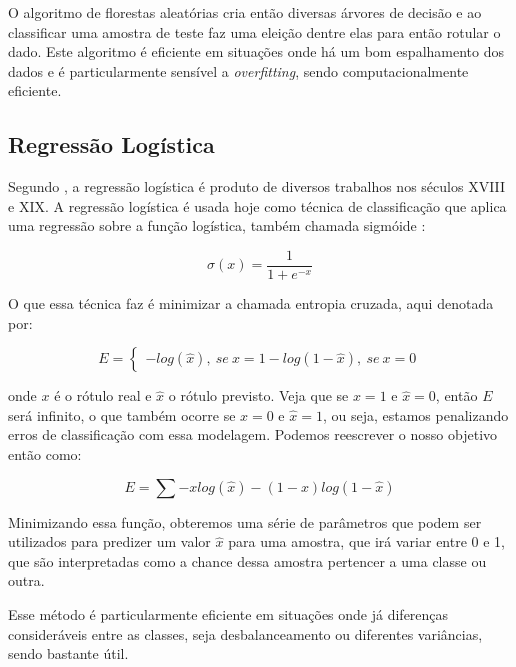 O algoritmo de florestas aleatórias cria então diversas árvores de decisão e ao classificar uma amostra de teste faz uma eleição dentre elas para então rotular o dado. Este algoritmo é eficiente em situações onde há um bom espalhamento dos dados e é particularmente sensível a \textit{overfitting}, sendo computacionalmente eficiente.

\subsection{Regressão Logística}
\label{section:metodologia:classificadores:regressao-logistica}

Segundo , a regressão logística é produto de diversos trabalhos nos séculos XVIII e XIX. A regressão logística é usada hoje como técnica de classificação que aplica uma regressão sobre a função logística, também chamada sigmóide \cite{logistic2017regression}:

\begin{equation}
    \sigma (x) = \frac{1}{1+e^{-x}}
\end{equation}

O que essa técnica faz é minimizar a chamada entropia cruzada, aqui denotada por:

\begin{equation}
    E = \begin{cases}
        -log(\hat{x}), \: se \: x=1
        -log(1-\hat{x}), \: se \: x=0
        \end{cases}
\end{equation}

onde $x$ é o rótulo real e $\hat{x}$ o rótulo previsto. Veja que se $x=1$ e $\hat{x}=0$, então $E$ será infinito, o que também ocorre se $x=0$ e $\hat{x}=1$, ou seja, estamos penalizando erros de classificação com essa modelagem. Podemos reescrever o nosso objetivo então como:

\begin{equation}
    E = \sum -x log(\hat{x})-(1-x)log(1-\hat{x})
\end{equation}

Minimizando essa função, obteremos uma série de parâmetros que podem ser utilizados para predizer um valor $\hat{x}$ para uma amostra, que irá variar entre 0 e 1, que são interpretadas como a chance dessa amostra pertencer a uma classe ou outra.

Esse método é particularmente eficiente em situações onde já diferenças consideráveis entre as classes, seja desbalanceamento ou diferentes variâncias, sendo bastante útil.

